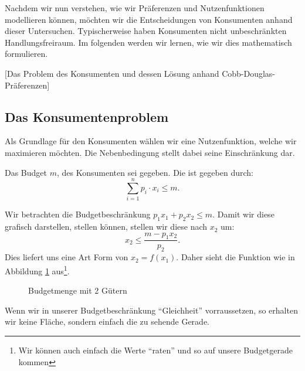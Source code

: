 Nachdem wir nun verstehen, wie wir Präferenzen und Nutzenfunktionen modellieren können, möchten wir die Entscheidungen von Konsumenten anhand dieser Untersuchen.
Typischerweise haben Konsumenten nicht unbeschränkten Handlungsfreiraum. Im folgenden werden wir lernen, wie wir dies mathematisch formulieren.

[Das Problem des Konsumenten und dessen Lösung anhand Cobb-Douglas-Präferenzen]
\subsection{Das Konsumentenproblem}

Als Grundlage für den Konsumenten wählen wir eine Nutzenfunktion, welche wir maximieren möchten.
Die Nebenbedingung stellt dabei seine Einschränkung dar.

\begin{definition}
	Das Budget $m$, des Konsumenten sei gegeben. Die   ist gegeben durch:
	\[
		\sum_{i=1}^{n} p_i \cdot x_i  \le m
		.\]
\end{definition}

\begin{example}
	Wir betrachten die Budgetbeschränkung $p_1 x_1 + p_2 x_2 \le  m$. Damit wir diese grafisch darstellen, stellen können, stellen wir diese nach $x_2$ um:
	\[
		x_2 \le  \frac{m-p_1 x_2}{p_2}
		.\]
	Dies liefert uns eine Art Form von $x_2 =f(x_1)$. Daher sieht die Funktion wie in Abbildung \ref{fig:budgetmenge} aus\footnote{Wir können auch einfach die Werte \enquote{raten} und so auf unsere Budgetgerade kommen}.
	\begin{figure}[h]
		\begin{center}


		\end{center}
		\caption{Budgetmenge mit 2 Gütern}
		\label{fig:budgetmenge}
	\end{figure}
	Wenn wir in unserer Budgetbeschränkung \enquote{Gleichheit} vorraussetzen, so erhalten wir keine Fläche, sondern einfach die zu sehende Gerade.
\end{example}

